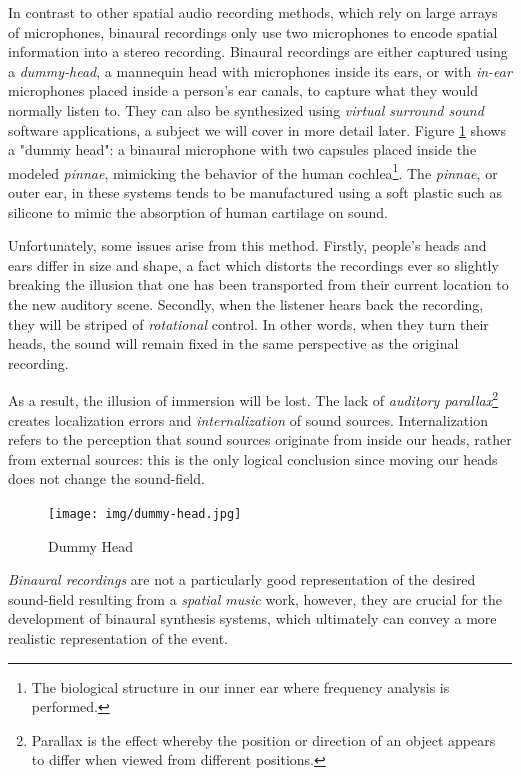 In contrast to other spatial audio recording methods, which rely on large arrays of microphones, binaural recordings only use two microphones to encode spatial information into a stereo recording. Binaural recordings are either captured using a \textit{dummy-head}, a mannequin head with microphones inside its ears, or with \textit{in-ear} microphones placed inside a person's ear canals, to capture what they would normally listen to. They can also be synthesized using \textit{virtual surround sound} software applications, a subject we will cover in more detail later. Figure \ref{fig:dummy-head} shows a "dummy head": a binaural microphone with two capsules placed inside the modeled \textit{pinnae}, mimicking the behavior of the human cochlea\footnote{The biological structure in our inner ear where frequency analysis is performed.}. The \textit{pinnae}, or outer ear, in these systems tends to be manufactured using a soft plastic such as silicone to mimic the absorption of human cartilage on sound.

Unfortunately, some issues arise from this method. Firstly, people's heads and ears differ in size and shape, a fact which distorts the recordings ever so slightly breaking the illusion that one has been transported from their current location to the new auditory scene. Secondly, when the listener hears back the recording, they will be striped of \textit{rotational} control. In other words, when they turn their heads, the sound will remain fixed in the same perspective as the original recording.

As a result, the illusion of immersion will be lost. The lack of \textit{auditory parallax}\footnote{Parallax is the effect whereby the position or direction of an object appears to differ when viewed from different positions.} creates localization errors and \textit{internalization} of sound sources. Internalization refers to the perception that sound sources originate from inside our heads, rather from external sources: this is the only logical conclusion since moving our heads does not change the sound-field. 

\begin{figure}[ht!]%
\centering
\texttt{[image: img/dummy-head.jpg]} 
\caption{Dummy Head \cite{FileGeor45online}}
\label{fig:dummy-head}
\end{figure}

\textit{Binaural recordings} are not a particularly good representation of the desired sound-field resulting from a \textit{spatial music} work, however, they are crucial for the development of binaural synthesis systems, which ultimately can convey a more realistic representation of the event. 

